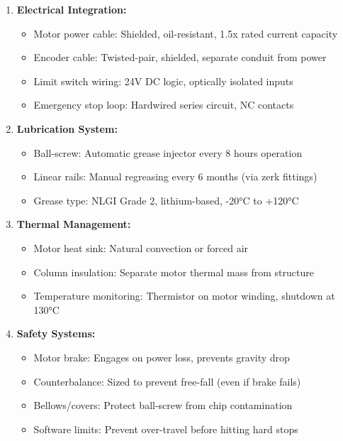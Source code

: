 \documentclass[
]{article}
\providecommand{\tightlist}{%
  \setlength{\itemsep}{0pt}\setlength{\parskip}{0pt}}
\begin{document}
\begin{enumerate}
\def\labelenumi{\arabic{enumi}.}
\tightlist
\item
  \textbf{Electrical Integration:}

  \begin{itemize}
  \tightlist
  \item
    Motor power cable: Shielded, oil-resistant, 1.5x rated current
    capacity
  \item
    Encoder cable: Twisted-pair, shielded, separate conduit from power
  \item
    Limit switch wiring: 24V DC logic, optically isolated inputs
  \item
    Emergency stop loop: Hardwired series circuit, NC contacts
  \end{itemize}
\item
  \textbf{Lubrication System:}

  \begin{itemize}
  \tightlist
  \item
    Ball-screw: Automatic grease injector every 8 hours operation
  \item
    Linear rails: Manual regreasing every 6 months (via zerk fittings)
  \item
    Grease type: NLGI Grade 2, lithium-based, -20°C to +120°C
  \end{itemize}
\item
  \textbf{Thermal Management:}

  \begin{itemize}
  \tightlist
  \item
    Motor heat sink: Natural convection or forced air
  \item
    Column insulation: Separate motor thermal mass from structure
  \item
    Temperature monitoring: Thermistor on motor winding, shutdown at
    130°C
  \end{itemize}
\item
  \textbf{Safety Systems:}

  \begin{itemize}
  \tightlist
  \item
    Motor brake: Engages on power loss, prevents gravity drop
  \item
    Counterbalance: Sized to prevent free-fall (even if brake fails)
  \item
    Bellows/covers: Protect ball-screw from chip contamination
  \item
    Software limits: Prevent over-travel before hitting hard stops
  \end{itemize}
\end{enumerate}
\end{document}
